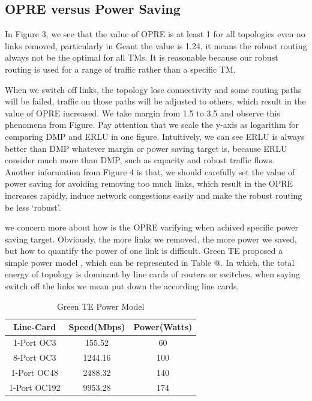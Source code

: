 \documentclass[conference]{IEEEtran}
\makeatletter
\newcommand{\Rmnum}[1]{\expandafter\@slowromancap\romannumeral #1@}
\makeatother
\begin{document}
\subsection{OPRE versus Power Saving}
In Figure 3, we see that the value of OPRE is at least 1 for all topologies even no links removed, particularly in Geant the value is 1.24,
it means the robust routing always not be the optimal for all TMs. It is reasonable because our robust routing is used for a range of traffic
rather than a specific TM.


When we switch off links, the topology lose connectivity and some routing paths will be failed, traffic on those paths will be
adjusted to others, which result in the value of OPRE increased. We take margin from 1.5 to 3.5 and observe this phenomena from Figure.
Pay attention that we scale the y-axis as logarithm for comparing DMP and ERLU in one figure. Intuitively, we can see ERLU is always
better than DMP whatever margin or power saving target is, because ERLU consider much more than DMP, such as capacity and robust traffic
flows. Another information from Figure 4 is that, we should carefully set the value of power saving for avoiding removing too much
links, which result in the OPRE increases rapidly, induce network congestions easily and make the robust routing be less `robust'.


we concern more about how is the OPRE varifying when achived specific power saving target. Obviously, the more links we removed,
the more power we saved, but how to quantify the power of one link is difficult. Green TE proposed a simple power model \cite{networking:greente},
which can be represented in Table \Rmnum{2}. In which, the total energy of topology is dominant by line cards of routers or switches,
when saying switch off the links we mean put down the according line cards.

\begin{table}[!t]
\renewcommand{\arraystretch}{1}
\caption{Green TE Power Model}
\label{power model}
\centering
\begin{tabular}{|c|c|c|}
\hline
\bfseries Line-Card & \bfseries Speed(Mbps) & \bfseries Power(Watts) \\
\hline
1-Port OC3 & 155.52 & 60 \\
\hline
8-Port OC3 & 1244.16 & 100 \\
\hline
1-Port OC48 & 2488.32 & 140 \\
\hline
1-Port OC192 & 9953.28 & 174 \\
\hline
\end{tabular}
\end{table}
\end{document}
